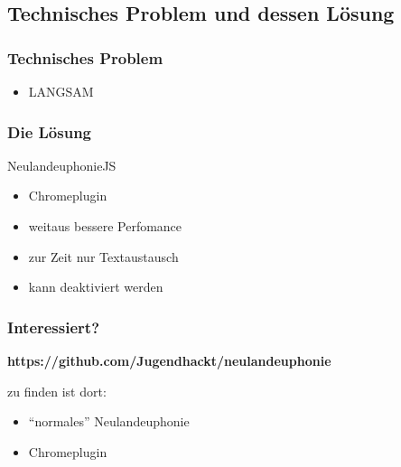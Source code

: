 \documentclass [xcolor=dvipsnames] {beamer}
\begin{document}
\subsection{Technisches Problem und dessen Lösung}
\begin{frame}
	\frametitle{\sc Technisches Problem}
	\begin{center}
		\begin{itemize}
			\item LANGSAM
		\end{itemize}
	\end{center}
\end{frame}
\begin{frame}
	\frametitle{\sc Die Lösung}
	\begin{center}
		{\Large NeulandeuphonieJS}
	\end{center}
	\begin{itemize}
		\item Chromeplugin
		\item weitaus bessere Perfomance
		\item zur Zeit nur Textaustausch
		\item kann deaktiviert werden
	\end{itemize}
\end{frame}
\begin{frame}
	\frametitle{\sc Interessiert?}
	\begin{center}
		{\bf https://github.com/Jugendhackt/neulandeuphonie}
	\end{center}
\end{frame}
\note
{
	{zu finden ist dort:}
	\\
	\begin{itemize}
		\item "`normales"' Neulandeuphonie
		\item Chromeplugin
	\end{itemize}
}

\begin{frame}
	\titlepage
\end{frame}
\end{document}
